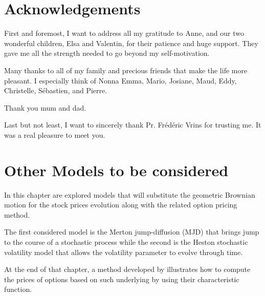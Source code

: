 \documentclass[12pt,a4paper]{report}
\begin{document}
\chapter*{Acknowledgements}

First and foremost, I want to address all my gratitude to Anne, and our two wonderful children, Elsa and Valentin, for their patience and huge support. They gave me all the strength needed to go beyond my self-motivation.

Many thanks to all of my family and precious friends that make the life more pleasant. I especially think of Nonna Emma, Mario, Josiane, Maud, Eddy, Christelle, Sébastien, and Pierre. 

Thank you mum and dad.

Last but not least, I want to sincerely thank Pr. Frédéric Vrins for trusting me. It was a real pleasure to meet you.




{
\tableofcontents
\clearpage

\listoffigures
 \clearpage


\listoftables}
\clearpage



%
%
\chapter{Other Models to be considered}
\label{cha:OtherModel}

In this chapter are explored models that will substitute the geometric Brownian motion for the stock prices evolution along with the related option pricing method.

The first considered model is the Merton jump-diffusion (MJD) that brings jump to the course of a stochastic process while the second is the Heston stochastic volatility model that allows the volatility parameter to evolve through time.

At the end of that chapter, a method developed by \citet{heston1993} illustrates how to compute the prices of options based on such underlying by using their characteristic function.
\end{document}
